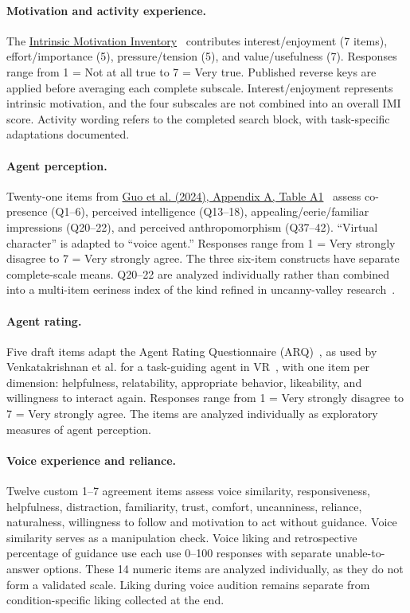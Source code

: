 \paragraph{Motivation and activity experience.} The \href{https://selfdeterminationtheory.org/intrinsic-motivation-inventory/}{Intrinsic Motivation Inventory}~\cite{ryan1982control,mcauley1989imi} contributes interest/enjoyment (7 items), effort/importance (5), pressure/tension (5), and value/usefulness (7). Responses range from 1 = Not at all true to 7 = Very true. Published reverse keys are applied before averaging each complete subscale. Interest/enjoyment represents intrinsic motivation, and the four subscales are not combined into an overall IMI score. Activity wording refers to the completed search block, with task-specific adaptations documented.

\paragraph{Agent perception.} Twenty-one items from \href{https://doi.org/10.1145/3651288}{Guo et al. (2024), Appendix A, Table A1}~\cite{guo2024doppelganger} assess co-presence (Q1--6), perceived intelligence (Q13--18), appealing/eerie/familiar impressions (Q20--22), and perceived anthropomorphism (Q37--42). ``Virtual character'' is adapted to ``voice agent.'' Responses range from 1 = Very strongly disagree to 7 = Very strongly agree. The three six-item constructs have separate complete-scale means. Q20--22 are analyzed individually rather than combined into a multi-item eeriness index of the kind refined in uncanny-valley research~\cite{homacdorman2017eeriness}.

\paragraph{Agent rating.} Five draft items adapt the Agent Rating Questionnaire (ARQ)~\cite{wang2020terrible}, as used by Venkatakrishnan et al. for a task-guiding agent in VR~\cite{venkatakrishnan2026clarifying}, with one item per dimension: helpfulness, relatability, appropriate behavior, likeability, and willingness to interact again. Responses range from 1 = Very strongly disagree to 7 = Very strongly agree. The items are analyzed individually as exploratory measures of agent perception.

\paragraph{Voice experience and reliance.} Twelve custom 1--7 agreement items assess voice similarity, responsiveness, helpfulness, distraction, familiarity, trust, comfort, uncanniness, reliance, naturalness, willingness to follow and motivation to act without guidance. Voice similarity serves as a manipulation check. Voice liking and retrospective percentage of guidance use each use 0--100 responses with separate unable-to-answer options. These 14 numeric items are analyzed individually, as they do not form a validated scale. Liking during voice audition remains separate from condition-specific liking collected at the end.

